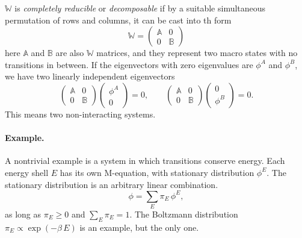 \documentclass{book}
\numberwithin{equation}{section}
\theoremstyle{plain}
\theoremstyle{definition}
\theoremstyle{remark}
\theoremstyle{BoldStyle}
\numberwithin{exercise}{section}
\begin{document}
$\mathbb W$ is \emph{completely reducible} or \emph{decomposable}
if by a suitable simultaneous permutation of rows and columns,
it can be cast into th form
%
\begin{equation}
  \mathbb W
  =
  \left(
  \begin{array}{ccc}
    \mathbb A   &     0     \\
    0           & \mathbb B
  \end{array}
  \right)
  \label{eq:W_decomposable}
\end{equation}
%
here $\mathbb A$ and $\mathbb B$ are also $\mathbb W$ matrices,
and they represent two macro states with no transitions in between.
%
If the eigenvectors with zero eigenvalues are $\phi^A$ and $\phi^B$,
we have two linearly independent eigenvectors
%
\begin{equation*}
  \left(
    \begin{array}{ccc}
      \mathbb A   &     0 \\
      0           & \mathbb B
    \end{array}
  \right)
  \left(
    \begin{array}{ccc}
      \phi^A \\
      0
    \end{array}
  \right)
  = 0,
  \qquad
  \left(
    \begin{array}{ccc}
      \mathbb A   &     0 \\
      0           & \mathbb B
    \end{array}
  \right)
  \left(
    \begin{array}{ccc}
      0 \\
      \phi^B
    \end{array}
  \right)
  = 0.
\end{equation*}
%
This means two non-interacting systems.
%


\paragraph*{Example.}

A nontrivial example is a system in which transitions conserve energy.
Each energy shell $E$ has its own M-equation,
with stationary distribution $\phi^E$.
The stationary distribution is an arbitrary linear combination.
$$
\phi = \sum_E \pi_E \, \phi^E,
$$
as long as $\pi_E \ge 0$ and $\sum_E \pi_E = 1$.
The Boltzmann distribution $\pi_E \propto \exp(-\beta \, E)$
is an example, but the only one.
\end{document}
